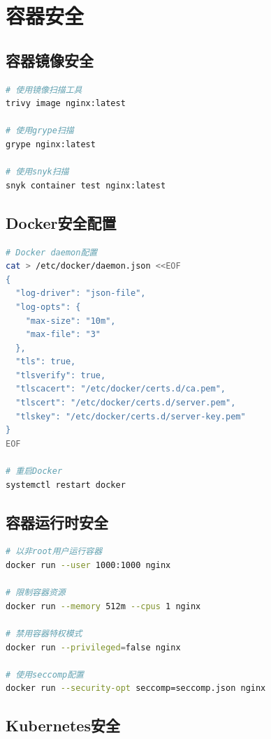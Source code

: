 \documentclass[12pt,UTF8]{ctexbook}
\begin{document}
\section{容器安全}
\label{sec:container-security}

\subsection*{容器镜像安全}

\begin{lstlisting}[language=bash]
# 使用镜像扫描工具
trivy image nginx:latest

# 使用grype扫描
grype nginx:latest

# 使用snyk扫描
snyk container test nginx:latest
\end{lstlisting}

\subsection*{Docker安全配置}

\begin{lstlisting}[language=bash]
# Docker daemon配置
cat > /etc/docker/daemon.json <<EOF
{
  "log-driver": "json-file",
  "log-opts": {
    "max-size": "10m",
    "max-file": "3"
  },
  "tls": true,
  "tlsverify": true,
  "tlscacert": "/etc/docker/certs.d/ca.pem",
  "tlscert": "/etc/docker/certs.d/server.pem",
  "tlskey": "/etc/docker/certs.d/server-key.pem"
}
EOF

# 重启Docker
systemctl restart docker
\end{lstlisting}

\subsection*{容器运行时安全}

\begin{lstlisting}[language=bash]
# 以非root用户运行容器
docker run --user 1000:1000 nginx

# 限制容器资源
docker run --memory 512m --cpus 1 nginx

# 禁用容器特权模式
docker run --privileged=false nginx

# 使用seccomp配置
docker run --security-opt seccomp=seccomp.json nginx
\end{lstlisting}

\subsection*{Kubernetes安全}
\end{document}

